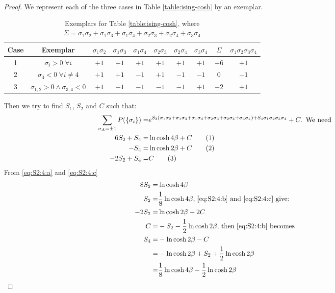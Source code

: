 \documentclass[]{article}
\newcommand\numberthis{\addtocounter{equation}{1}\tag{\theequation}}
\begin{document}
\begin{proof}
	We represent each of the three cases in Table \ref{table:ising-cosh} by an exemplar.
	\begin{table}[H]
		\caption[Exemplars for Table \ref{table:ising-cosh}]{Exemplars for Table \ref{table:ising-cosh}, where $\Sigma=\sigma_1\sigma_2 + \sigma_1\sigma_3+ \sigma_1\sigma_4 + \sigma_2 \sigma_3 + \sigma_2 \sigma_4 +\sigma_3 \sigma_4$}
		\begin{tabular}{|c|c|c|c|c|c|c|c|c|c|}\hline
			Case&Exemplar&$\sigma_1\sigma_2$&$\sigma_1\sigma_3$&$\sigma_1\sigma_4$&$\sigma_2\sigma_3$&$\sigma_2\sigma_4$&$\sigma_3\sigma_4$&$\Sigma$&$\sigma_1\sigma_2\sigma_3\sigma_4$\\ \hline
			1&$\sigma_i>0\;\forall i$&$+1$&$+1$&$+1$&$+1$&$+1$&$+1$&$+6$&$+1$\\ \hline
			2&$\sigma_4<0\;\forall i\ne 4$&$+1$&$+1$&$-1$&$+1$&$-1$&$-1$&$0$&$-1$\\ \hline
			3&$\sigma_{1,2}>0\land\sigma_{3,4}<0$&$+1$&$-1$&$-1$&$-1$&$-1$&$+1$&$-2$&$+1$\\ \hline
		\end{tabular}
	\end{table}
	Then we try to find $S_1$, $S_2$ and $C$ such that:
	\begin{align*}
		\sum_{\sigma_A=\pm 1} P(\{\sigma_i\}) =&e^{S_2 (\sigma_1\sigma_2 + \sigma_1\sigma_3+ \sigma_1\sigma_4 + \sigma_2 \sigma_3 + \sigma_2 \sigma_4 +\sigma_3 \sigma_4) + S_4 \sigma_1 \sigma_2 \sigma_3 \sigma_4}+C \text{. We need}\\
		6 S_2 + S_4 =& \ln \cosh 4\beta + C \numberthis \label{eq:S2:4:a}\\ 
		-S_4 =& \ln \cosh 2\beta+C\numberthis \label{eq:S2:4:b}\\ 
		-2S_2+S_4 =& C \numberthis \label{eq:S2:4:c}
	\end{align*}
	From \eqref{eq:S2:4:a} and \eqref{eq:S2:4:c}
	\begin{align*}
		8S_2 =& \ln \cosh 4\beta\\
		S_2 =& \frac{1}{8} \ln \cosh 4\beta \text{,  \eqref{eq:S2:4:b} and \eqref{eq:S2:4:c} give:}\\
		-2S_2 =& \ln \cosh 2\beta + 2C\\
		C =& -S_2 - \frac{1}{2} \ln \cosh 2\beta \text{, then \eqref{eq:S2:4:b} becomes}\\
		S_4 =& - \ln \cosh 2\beta - C\\
		=& - \ln \cosh 2\beta + S_2 + \frac{1}{2} \ln \cosh 2\beta\\
		=& \frac{1}{8} \ln \cosh 4\beta  - \frac{1}{2} \ln \cosh 2\beta
	\end{align*}

\end{proof}
\end{document}

